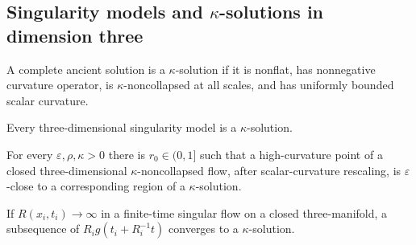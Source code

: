 \subsection{\texorpdfstring{Singularity models and \(\kappa\)-solutions in dimension three}{Singularity models and Kappa-solutions in dimension three}}

\begin{definition}
\label{def:chow-iv-kappa-solution}
A complete ancient solution is a \(\kappa\)-solution if it is nonflat, has
nonnegative curvature operator, is \(\kappa\)-noncollapsed at all scales, and
has uniformly bounded scalar curvature.
\end{definition}

\begin{theorem}
\label{thm:chow-iv-3d-models-kappa}
Every three-dimensional singularity model is a \(\kappa\)-solution.
\end{theorem}

\begin{theorem}
\label{thm:chow-iv-canonical-neighborhood}
For every \(\varepsilon,\rho,\kappa>0\) there is \(r_0\in(0,1]\) such that a
high-curvature point of a closed three-dimensional \(\kappa\)-noncollapsed
flow, after scalar-curvature rescaling, is \(\varepsilon\)-close to a
corresponding region of a \(\kappa\)-solution.
\end{theorem}

\begin{theorem}
\label{thm:chow-iv-3d-models-all-scales}
If \(R(x_i,t_i)\to\infty\) in a finite-time singular flow on a closed
three-manifold, a subsequence of
\(R_i g(t_i+R_i^{-1}t)\) converges to a \(\kappa\)-solution.
\end{theorem}

